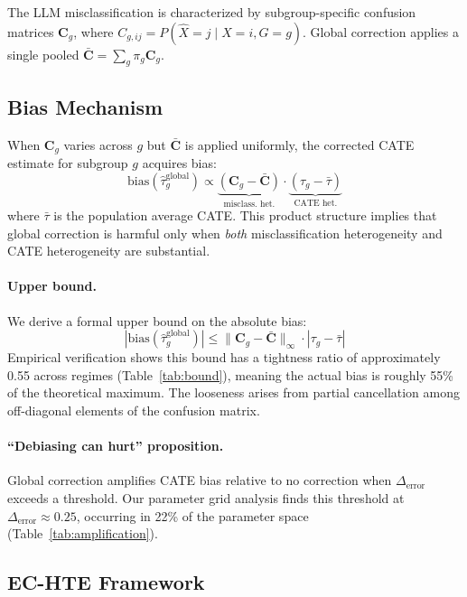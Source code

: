 \documentclass[11pt,a4paper]{article}
\begin{document}
The LLM misclassification is characterized by subgroup-specific confusion matrices $\mathbf{C}_g$, where $C_{g,ij} = P(\hat{X} = j \mid X = i, G = g)$. Global correction applies a single pooled $\bar{\mathbf{C}} = \sum_g \pi_g \mathbf{C}_g$.

\subsection{Bias Mechanism}

When $\mathbf{C}_g$ varies across $g$ but $\bar{\mathbf{C}}$ is applied uniformly, the corrected CATE estimate for subgroup $g$ acquires bias:
\begin{equation}
    \text{bias}(\hat{\tau}_g^{\text{global}}) \propto \underbrace{(\mathbf{C}_g - \bar{\mathbf{C}})}_{\text{misclass. het.}} \cdot \underbrace{(\tau_g - \bar{\tau})}_{\text{CATE het.}}
    \label{eq:bias}
\end{equation}
where $\bar{\tau}$ is the population average CATE. This product structure implies that global correction is harmful only when \emph{both} misclassification heterogeneity and CATE heterogeneity are substantial.

\paragraph{Upper bound.} We derive a formal upper bound on the absolute bias:
\begin{equation}
    |\text{bias}(\hat{\tau}_g^{\text{global}})| \leq \|\mathbf{C}_g - \bar{\mathbf{C}}\|_{\infty} \cdot |\tau_g - \bar{\tau}|
    \label{eq:bound}
\end{equation}
Empirical verification shows this bound has a tightness ratio of approximately 0.55 across regimes (Table~\ref{tab:bound}), meaning the actual bias is roughly 55\% of the theoretical maximum. The looseness arises from partial cancellation among off-diagonal elements of the confusion matrix.

\paragraph{``Debiasing can hurt'' proposition.} Global correction amplifies CATE bias relative to no correction when $\Delta_{\text{error}}$ exceeds a threshold. Our parameter grid analysis finds this threshold at $\Delta_{\text{error}} \approx 0.25$, occurring in 22\% of the parameter space (Table~\ref{tab:amplification}).

\subsection{EC-HTE Framework}
\end{document}
